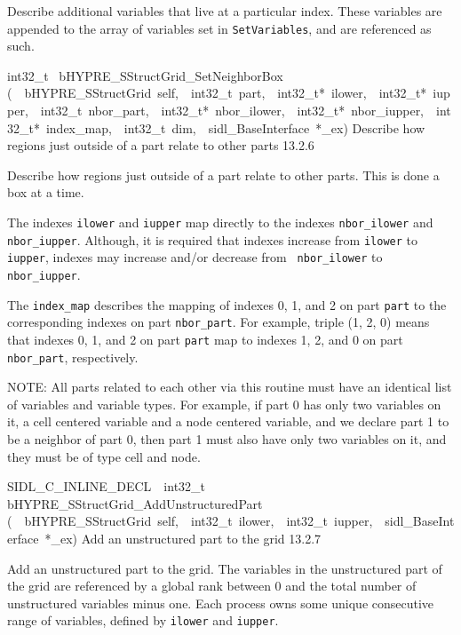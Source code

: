 \documentclass{article}
\begin{document}
\begin{cxxentry}
\begin{cxxentry}
\begin{cxxfunction}
\begin{cxxdoc}
Describe additional variables that live at a particular
index.  These variables are appended to the array of
variables set in {\tt SetVariables}, and are referenced as
such.
\end{cxxdoc}
\end{cxxfunction}
\begin{cxxfunction}
{int32\_t\ }
        {bHYPRE\_SStructGrid\_SetNeighborBox}
        {(\ \ bHYPRE\_SStructGrid\ self,\ \ int32\_t\ part,\ \ int32\_t*\ ilower,\ \ int32\_t*\ iupper,\ \ int32\_t\ nbor\_part,\ \ int32\_t*\ nbor\_ilower,\ \ int32\_t*\ nbor\_iupper,\ \ int32\_t*\ index\_map,\ \ int32\_t\ dim,\ \ sidl\_BaseInterface\ *\_ex)}
        {
Describe how regions just outside of a part relate to other
parts}
        {13.2.6}
\begin{cxxdoc}

Describe how regions just outside of a part relate to other
parts.  This is done a box at a time.

The indexes {\tt ilower} and {\tt iupper} map directly to the
indexes {\tt nbor\_ilower} and {\tt nbor\_iupper}.  Although,
it is required that indexes increase from {\tt ilower} to
{\tt iupper}, indexes may increase and/or decrease from {\tt
nbor\_ilower} to {\tt nbor\_iupper}.

The {\tt index\_map} describes the mapping of indexes 0, 1,
and 2 on part {\tt part} to the corresponding indexes on part
{\tt nbor\_part}.  For example, triple (1, 2, 0) means that
indexes 0, 1, and 2 on part {\tt part} map to indexes 1, 2,
and 0 on part {\tt nbor\_part}, respectively.

NOTE: All parts related to each other via this routine must
have an identical list of variables and variable types.  For
example, if part 0 has only two variables on it, a cell
centered variable and a node centered variable, and we
declare part 1 to be a neighbor of part 0, then part 1 must
also have only two variables on it, and they must be of type
cell and node.
\end{cxxdoc}
\end{cxxfunction}
\begin{cxxfunction}
{SIDL\_C\_INLINE\_DECL\ \ int32\_t\ }
        {bHYPRE\_SStructGrid\_AddUnstructuredPart}
        {(\ \ bHYPRE\_SStructGrid\ self,\ \ int32\_t\ ilower,\ \ int32\_t\ iupper,\ \ sidl\_BaseInterface\ *\_ex)}
        {
Add an unstructured part to the grid}
        {13.2.7}
\begin{cxxdoc}

Add an unstructured part to the grid.  The variables in the
unstructured part of the grid are referenced by a global rank
between 0 and the total number of unstructured variables
minus one.  Each process owns some unique consecutive range
of variables, defined by {\tt ilower} and {\tt iupper}.


\end{cxxdoc}
\end{cxxfunction}
\end{cxxentry}
\end{cxxentry}
\end{document}
